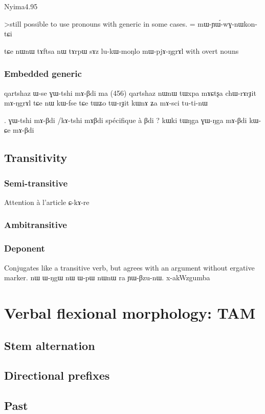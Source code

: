 \documentclass[oldfontcommands,oneside,a4paper,11pt]{memoir}
\newcommand{\wav}[1]{}%
\begin{document}
Nyima4.95

>still possible to use pronouns with generic in some cases. = mɯ-ɲɯ́-wɣ-nɯkon-tɕi

tɕe nɯnɯ tɤftsa nɯ tɤrpɯ sɤz lu-kɯ-moŋlo mɯ-pjɤ-ŋgrɤl
with overt nouns
\subsection{Embedded generic}
qartshaz ɯ-se ɣɯ-tshi mɤ-βdi ma (456)
qartshaz nɯnɯ tɯxpa mɤɕtʂa chɯ-rɤrɟit mɤ-ŋgrɤl tɕe
nɯ kɯ-fse tɕe tɯʑo tɯ-rɟit kɯnɤ ʑa mɤ-sci tu-ti-nɯ

  \wav{x-27-qartshaz}  .
  ɣɯ-tshi mɤ-βdi /kɤ-tshi mɤβdi
  spécifique à βdi ?
  kɯki tɯŋga ɣɯ-ŋga mɤ-βdi
  kɯ-ɕe mɤ-βdi
  \wav{gram_embedded_generic}
  
\section{Transitivity} \label{sec:transitivity}
\subsection{Semi-transitive}

Attention à l'article ɕ-kɤ-re
\subsection{Ambitransitive} \label{sub:ambitransitive}

\subsection{Deponent} \label{sub:deponent}
Conjugates like a transitive verb, but agrees with an argument without ergative marker.
nɯ ɯ-ŋgɯ nɯ ɯ-pɯ nɯnɯ ra ɲɯ-βzu-nɯ.
x-akWzgumba
\chapter{Verbal flexional morphology: TAM}
\section{Stem alternation}
\section{Directional prefixes}

\section{Past} \label{sec:past}
\end{document}
